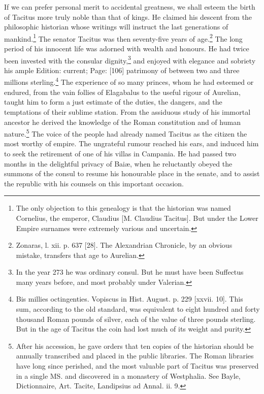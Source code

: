 If we can prefer personal merit to accidental greatness, we shall esteem the birth of Tacitus more truly noble than that of kings. He claimed his descent from the philosophic historian whose writings will instruct the last generations of mankind.\footnote{The only objection to this genealogy is that the historian was named Cornelius, the emperor, Claudius [M. Claudius Tacitus]. But under the Lower Empire surnames were extremely various and uncertain.} The senator Tacitus was then seventy-five years of age.\footnote{Zonaras, l. xii. p. 637 [28]. The Alexandrian Chronicle, by an obvious mistake, transfers that age to Aurelian.} The long period of his innocent life was adorned with wealth and honours. He had twice been invested with the consular dignity,\footnote{In the year 273 he was ordinary consul. But he must have been Suffectus many years before, and most probably under Valerian.} and enjoyed with elegance and sobriety his ample Edition: current; Page: [106] patrimony of between two and three millions sterling.\footnote{Bis millies octingenties. Vopiscus in Hist. August. p. 229 [xxvii. 10]. This sum, according to the old standard, was equivalent to eight hundred and forty thousand Roman pounds of silver, each of the value of three pounds sterling. But in the age of Tacitus the coin had lost much of its weight and purity.} The experience of so many princes, whom he had esteemed or endured, from the vain follies of Elagabalus to the useful rigour of Aurelian, taught him to form a just estimate of the duties, the dangers, and the temptations of their sublime station. From the assiduous study of his immortal ancestor he derived the knowledge of the Roman constitution and of human nature.\footnote{After his accession, he gave orders that ten copies of the historian should be annually transcribed and placed in the public libraries. The Roman libraries have long since perished, and the most valuable part of Tacitus was preserved in a single MS. and discovered in a monastery of Westphalia. See Bayle, Dictionnaire, Art. Tacite, Landipsius ad Annal. ii. 9.} The voice of the people had already named Tacitus as the citizen the most worthy of empire. The ungrateful rumour reached his ears, and induced him to seek the retirement of one of his villas in Campania. He had passed two months in the delightful privacy of Baiæ, when he reluctantly obeyed the summons of the consul to resume his honourable place in the senate, and to assist the republic with his counsels on this important occasion.

